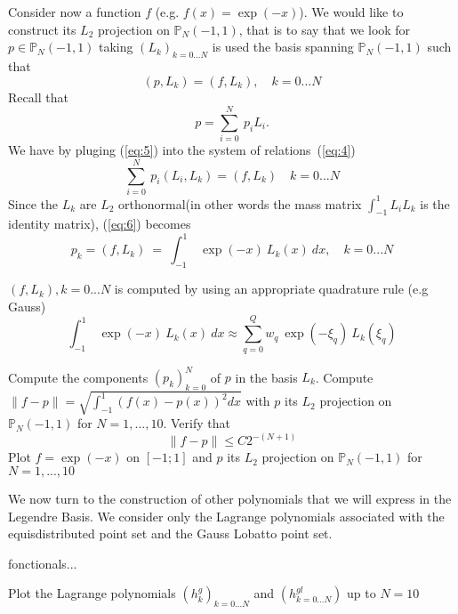 \documentclass{article}
\begin{document}
\begin{Exercise}[title={p type Galerkin method in 1D}]
  \ExePart
   Consider now a function $f$ (e.g. $f(x)=\exp(-x)$). We
  would like to construct its $L_2$ projection on
  $\mathbb{P}_N(-1,1)$, that is to say that we look for $p \in
  \mathbb{P}_N(-1,1)$ taking $(L_k)_{k=0...N}$ is used the basis spanning
  $\mathbb{P}_N(-1,1)$ such that
  \begin{equation}
    \label{eq:4}
    (p, L_k) = (f, L_k), \quad k=0...N
  \end{equation}
  Recall that
  \begin{equation}
    \label{eq:5}
    p=\sum_{i=0}^N\ p_i L_i.
  \end{equation}
  We have by pluging (\ref{eq:5}) into the system of relations~(\ref{eq:4})
  \begin{equation}
    \label{eq:6}
    \sum_{i=0}^N\ p_i (L_i,L_k) = (f, L_k)\quad k=0...N
  \end{equation}
  Since the $L_k$ are $L_2$ orthonormal(in other words the mass matrix
  $\int_{-1}^1 L_i L_k$ is the identity matrix), (\ref{eq:6}) becomes
  \begin{equation}
    \label{eq:7}
    p_k = (f, L_k)\ =\ \int_{-1}^1\ \exp(-x)\ L_k(x)\ dx, \quad k=0...N
  \end{equation}

  $(f,L_k), k=0...N$ is computed by using an appropriate quadrature
  rule (e.g Gauss)
  \begin{equation}
    \label{eq:8}
    \int_{-1}^1\ \exp(-x)\ L_k(x)\ dx \approx \sum_{q=0}^Q w_q\ \exp(-\xi_q)\ L_k(\xi_q)
  \end{equation}

  \Question Compute the components $(p_k)_{k=0}^N$ of $p$ in the basis
  $L_k$.
  \Question Compute $\|f-p\|=\sqrt{\int_{-1}^1 (f(x)-p(x))^2 dx}$ with $p$ its $L_2$ projection on
  $\mathbb{P}_N(-1,1)$ for $N=1,...,10$. Verify that
  \begin{equation}
    \label{eq:9}
    \|f-p\| \leq C 2^{-(N+1)}
  \end{equation}
  \Question Plot $f=\exp(-x)$
  on $[-1;1]$ and $p$ its $L_2$ projection on $\mathbb{P}_N(-1,1)$ for
  $N=1,...,10$

  \ExePart We now turn to the construction of other polynomials that
  we will express in the Legendre Basis. We consider only the Lagrange
  polynomials associated with the equisdistributed point set and the
  Gauss Lobatto point set.

  \Question fonctionals...

  \Question Plot the Lagrange polynomials $(h^g_k)_{k=0...N}$ and $(h^{gl}_{k=0...N})$ up to $N=10$


\end{Exercise}
\end{document}
